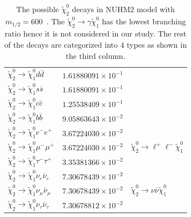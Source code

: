 \begin{table}[htb]
\begin{center}
{\begin{tabular}{lll}
                $\widetilde{\chi}_{2}^{0} \to \widetilde{\chi}_{1}^{0} d \bar{d}$                   & $1.61880091\times 10^{-1}$ & \\
                $\widetilde{\chi}_{2}^{0} \to \widetilde{\chi}_{1}^{0} s \bar{s}$                   & $1.61880091\times 10^{-1}$ & \\
                $\widetilde{\chi}_{2}^{0} \to \widetilde{\chi}_{1}^{0} c \bar{c}$                   & $1.25538409\times 10^{-1}$ & \\
                $\widetilde{\chi}_{2}^{0} \to \widetilde{\chi}_{1}^{0} b \bar{b}$                   & $9.05863643\times 10^{-2}$ & \\
                \hline
                $\widetilde{\chi}_{2}^{0} \to \widetilde{\chi}_{1}^{0} e^{-} e^{+}$                 & $3.67224030\times 10^{-2}$ & \multirow{3}{*}{$\widetilde{\chi}^{0}_{2} \to \ell^{+} \ell^{-} \widetilde{\chi}^{0}_{1}$}\\
                $\widetilde{\chi}_{2}^{0} \to \widetilde{\chi}_{1}^{0} \mu^{-} \mu^{+}$             & $3.67224030\times 10^{-2}$ & \\
                $\widetilde{\chi}_{2}^{0} \to \widetilde{\chi}_{1}^{0} \tau^{-} \tau^{+}$           & $3.35381366\times 10^{-2}$ & \\
                \hline
                $\widetilde{\chi}_{2}^{0} \to \widetilde{\chi}_{1}^{0} \nu_{e} \bar{\nu}_{e}$       & $7.30678439\times 10^{-2}$ & \multirow{3}{*}{$\widetilde{\chi}^{0}_{2} \to \nu \bar{\nu} \widetilde{\chi}^{0}_{1}$}\\
                $\widetilde{\chi}_{2}^{0} \to \widetilde{\chi}_{1}^{0} \nu_{\mu} \bar{\nu}_{\mu}$   & $7.30678439\times 10^{-2}$ & \\
                $\widetilde{\chi}_{2}^{0} \to \widetilde{\chi}_{1}^{0} \nu_{\tau} \bar{\nu}_{\tau}$ & $7.30678812\times 10^{-2}$ & \\
                \hline
                \hline
            \end{tabular}
        }
    \end{center}
    \caption{The possible $\widetilde{\chi}^{0}_{2}$ decays in NUHM2 model with $m_{1/2}=600$~{\GeV}.
    The $\widetilde{\chi}_{2}^{0} \to \gamma \widetilde{\chi}^{0}_{1}$ has the lowest branching ratio hence it is not considered in our study.
    The rest of the decays are categorized into 4 types as shown in the third column.}
    \label{tab:data_NUHM2_n2_decays}
\end{table}%

